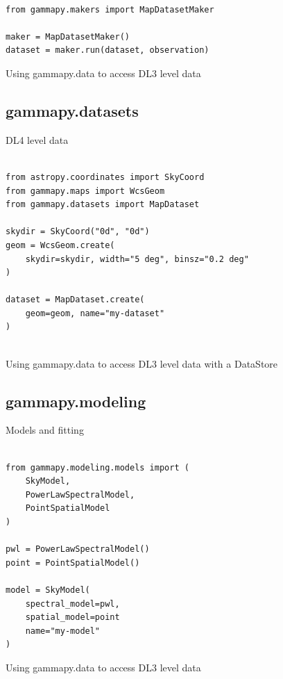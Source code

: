 \begin{listing}
\begin{verbatim}

from gammapy.makers import MapDatasetMaker

maker = MapDatasetMaker()
dataset = maker.run(dataset, observation)

\end{verbatim}
\caption{Using gammapy.data to access DL3 level data}
\label{codeexample:maker}
\end{listing}


\subsection{gammapy.datasets}
DL4 level data


\begin{listing}
\begin{verbatim}

from astropy.coordinates import SkyCoord
from gammapy.maps import WcsGeom
from gammapy.datasets import MapDataset

skydir = SkyCoord("0d", "0d")
geom = WcsGeom.create(
	skydir=skydir, width="5 deg", binsz="0.2 deg"
)

dataset = MapDataset.create(
	geom=geom, name="my-dataset"
)


\end{verbatim}
\caption{Using gammapy.data to access DL3 level data with a DataStore}
\label{codeexample:data}
\end{listing}



\subsection{gammapy.modeling}
Models and fitting

\begin{listing}
\begin{verbatim}

from gammapy.modeling.models import (
	SkyModel,
	PowerLawSpectralModel,
	PointSpatialModel
)

pwl = PowerLawSpectralModel()
point = PointSpatialModel()

model = SkyModel(
	spectral_model=pwl,
	spatial_model=point
	name="my-model"
)
\end{verbatim}
\caption{Using gammapy.data to access DL3 level data}
\label{codeexample:maker}
\end{listing}


